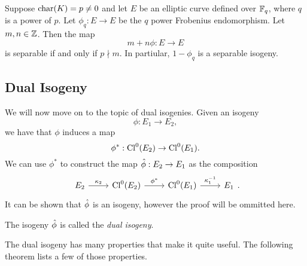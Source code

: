 \begin{proposition}
	\label{prop:frobenius-separable}
	Suppose $\operatorname{char}(K) = p \neq 0$ and
	let $E$ be an elliptic curve defined over
	$\mathbb{F}_q$, where $q$ is a power of $p$. 
	Let $\phi_q: E \to E$ be the
	$q$ power Frobenius endomorphism.
	Let $m, n \in \mathbb{Z}$.
	Then the map
	\begin{equation*}
		m + n\phi: E\to E
	\end{equation*}
	is separable if and only if $p\nmid m$.
	In partiular, $1 - \phi_q$ is a separable isogeny.
\end{proposition}

\subsection{Dual Isogeny}

We will now move on to the topic of dual isogenies. Given an isogeny
\begin{equation*}
	\phi: E_1 \to E_2,
\end{equation*}
we have that $\phi$ induces a map
\begin{equation*}
	\phi^*: \operatorname{Cl}^0(E_2) \to \operatorname{Cl}^0(E_1).
\end{equation*}
We can use $\phi^*$ to construct the map $\Hat\phi: E_2 \to E_1$
as the composition
\begin{equation*}
	\begin{tikzcd}
		{E_2} & {\Cl^0(E_2)} & {\Cl^0(E_1)} & {E_1}
		\arrow["{\kappa_2}", from=1-1, to=1-2]
		\arrow["{\phi^*}", from=1-2, to=1-3]
		\arrow["{\kappa_1^{-1}}", from=1-3, to=1-4]
	\end{tikzcd}.
\end{equation*}
It can be shown that $\Hat\phi$ is an isogeny, however the proof will be
ommitted here.

\begin{definition}
	The isogeny $\Hat\phi$ is called the \emph{dual isogeny}.
\end{definition}

The dual isogeny has many properties that make it quite useful.
The following theorem lists a few of those properties.


